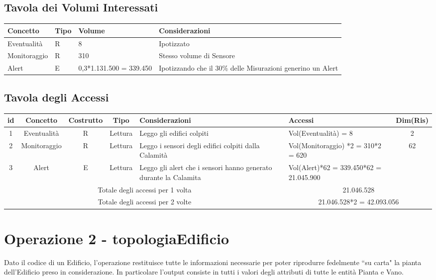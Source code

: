 \documentclass[12pt,a4paper]{report}
\begin{document}
        \subsection{Tavola dei Volumi Interessati}
        \begin{tabular}{|p{4cm}|p{1cm}|p{3cm}|p{8cm}|}
            \hline
            \textbf{Concetto} & \textbf{Tipo} & \textbf{Volume} & \textbf{Considerazioni} \\ \hline
            Eventualità & R & 8 & Ipotizzato \\ \hline
            Monitoraggio & R & 310 & Stesso volume di Sensore \\ \hline
            Alert & E & 0,3*1.131.500 = 339.450 & Ipotizzando che il 30\% delle Misurazioni generino un Alert \\ \hline
        \end{tabular}
        
        \subsection{Tavola degli Accessi}
        \begin{tabular}{|c|c|c|c|p{4cm}|p{3.5cm}|c|}
            \hline
            \textbf{id} & \textbf{Concetto} & \textbf{Costrutto} & \textbf{Tipo} & \textbf{Considerazioni} & \textbf{Accessi} & \textbf{Dim(Ris)} \\ \hline
            1 & Eventualità & R & Lettura & Leggo gli edifici colpiti & Vol(Eventualità) = 8 & 2 \\ \hline
            2 & Monitoraggio & R & Lettura & Leggo i sensori degli edifici colpiti dalla Calamità & Vol(Monitoraggio) *2 = 310*2 = 620 & 62 \\ \hline
            3 & Alert & E & Lettura & Leggo gli alert che i sensori hanno generato durante la Calamita & Vol(Alert)*62 = 339.450*62 = 21.045.900 & ~ \\ \hline
            \multicolumn{5}{|c|}{Totale degli accessi per 1 volta} & \multicolumn{2}{|c|}{21.046.528} \\ \hline
            \multicolumn{5}{|c|}{Totale degli accessi per 2 volte} & \multicolumn{2}{|c|}{21.046.528*2 = 42.093.056} \\ \hline
        \end{tabular}

        \newpage

        \section{Operazione 2 - topologiaEdificio}
        Dato il codice di un Edificio, l'operazione restituisce tutte le informazioni necessarie per poter riprodurre fedelmente ``su carta" la pianta dell'Edificio preso in considerazione. In particolare l'output consiste in tutti i valori degli attributi di tutte le entità Pianta e Vano.
        
\end{document}
